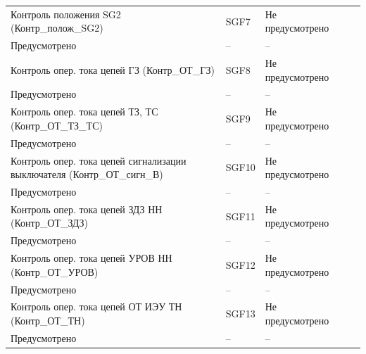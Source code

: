 \begin{longtable}{|>{\centering\arraybackslash}m{5.3cm}|>{\centering\arraybackslash}m{3.3cm}|>{\centering\arraybackslash}m{4.2cm}|>{\centering\arraybackslash}m{1.8cm}|>{\centering\arraybackslash}m{1cm}|}
\hline
\centering Контроль положения SG2 (Контр\_полож\_SG2)  & \centering SGF7 & \centering Не предусмотрено \\ Предусмотрено & \centering -- & \centering \arraybackslash -- \\
\hline
\centering Контроль опер. тока цепей ГЗ (Контр\_ОТ\_ГЗ)  & \centering SGF8 & \centering Не предусмотрено \\ Предусмотрено & \centering -- & \centering \arraybackslash -- \\
\hline
\centering Контроль опер. тока цепей ТЗ, ТС (Контр\_ОТ\_ТЗ\_ТС)  & \centering SGF9 & \centering Не предусмотрено \\ Предусмотрено & \centering -- & \centering \arraybackslash -- \\
\hline
\centering Контроль опер. тока цепей сигнализации выключателя (Контр\_ОТ\_сигн\_В)  & \centering SGF10 & \centering Не предусмотрено \\ Предусмотрено & \centering -- & \centering \arraybackslash -- \\
\hline
\centering Контроль опер. тока цепей ЗДЗ НН (Контр\_ОТ\_ЗДЗ)  & \centering SGF11 & \centering Не предусмотрено \\ Предусмотрено & \centering -- & \centering \arraybackslash -- \\
\hline
\centering Контроль опер. тока цепей УРОВ НН (Контр\_ОТ\_УРОВ)  & \centering SGF12 & \centering Не предусмотрено \\ Предусмотрено & \centering -- & \centering \arraybackslash -- \\
\hline
\centering Контроль опер. тока цепей ОТ ИЭУ ТН (Контр\_ОТ\_ТН)  & \centering SGF13 & \centering Не предусмотрено \\ Предусмотрено & \centering -- & \centering \arraybackslash -- \\
\hline
\end{longtable}
\normalsize